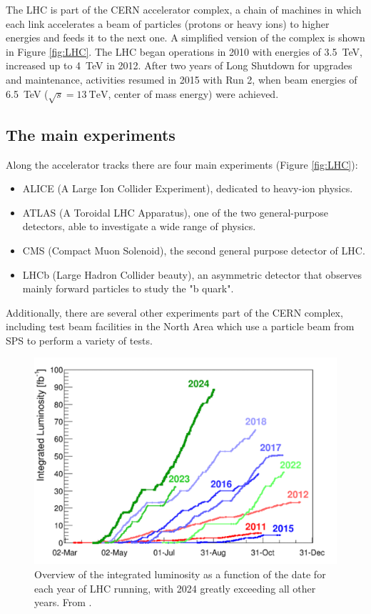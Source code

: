 The LHC is part of the CERN accelerator complex, a chain of machines in which each link accelerates a beam of particles (protons or heavy ions) to higher energies and feeds it to the next one. A simplified version of the complex is shown in Figure \ref{fig:LHC}. The LHC began operations in 2010 with energies of \qty{3.5}{\tera\electronvolt}, increased up to \qty{4}{\tera\electronvolt} in 2012. After two years of Long Shutdown for upgrades and maintenance, activities resumed in 2015 with Run 2, when beam energies of \qty{6.5}{\tera\electronvolt} ($\sqrt{s}=\qty{13}{\tera\electronvolt}$, center of mass energy) were achieved.


\subsection{The main experiments}\label{subsec:LHC_main_experiments}

Along the accelerator tracks there are four main experiments (Figure \ref{fig:LHC}):
\begin{itemize}
    \item ALICE (A Large Ion Collider Experiment), dedicated to heavy-ion physics\cite{homeALICE}.
    \item ATLAS (A Toroidal LHC Apparatus), one of the two general-purpose detectors, able to investigate a wide range of physics.
    \item CMS (Compact Muon Solenoid), the second general purpose detector of LHC.
    \item LHCb (Large Hadron Collider beauty), an asymmetric detector that observes mainly forward particles to study the "b quark".
\end{itemize}

Additionally, there are several other experiments part of the CERN complex, including test beam facilities in the North Area which use a particle beam from SPS to perform a variety of tests.

\begin{figure}[!ht]
    \centering
    \includegraphics[width=.6\linewidth]{Images/intro/integrated_luminosity.png}
    \captionsetup{width=.8\linewidth}
    \caption{Overview of the integrated luminosity as a function of the date for each year of LHC running, with 2024 greatly exceeding all other years. From \cite{homeAcceleratorReport}.}
    \label{fig:integrated_luminosity}
\end{figure}

